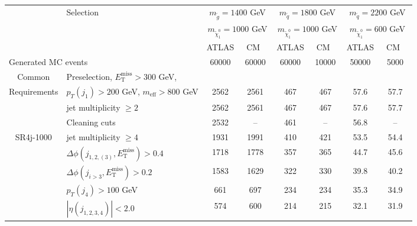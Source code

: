 \documentclass[10pt,fleqn]{article}
\newcommand{\met}{E^\mathrm{miss}_\mathrm{T}}
\newcommand{\meff}{m_\mathrm{eff}}
\begin{document}
\thispagestyle{empty}
\begin{table}[H]  \centering
 \renewcommand*{\arraystretch}{1.}
 \begin{tabular}{c|l|c|c|c|c|c|c} \toprule
      & Selection & \multicolumn{2}{c|}{$m_{\tilde{g}} = 1400$ GeV}      & \multicolumn{2}{c|}{$m_{\tilde{q}} = 1800$ GeV}         & \multicolumn{2}{c}{$m_{\tilde{q}} = 2200$ GeV}         \\ 
      &           & \multicolumn{2}{c|}{$m_{\tilde{\chi}^0_1} = 1000$ GeV}  & \multicolumn{2}{c|}{$m_{\tilde{\chi}^0_1} = 1000$ GeV}   & \multicolumn{2}{c}{$m_{\tilde{\chi}^0_1} = 600$ GeV}     \\ \midrule
      &           & ATLAS             &  ~CM~~                           & ATLAS             & ~CM~~                            & ATLAS             & ~CM~~                            \\ \midrule
\multicolumn{2}{l|}{Generated MC events}                       &   60000    &   60000   &  60000     &  10000    &     50000    &   5000         \\ \midrule   
Common& Preselection, $\met > 300$ GeV,&          &   &   &  & & \\ 
Requirements & $p_T(j_1) > 200$ GeV, $\meff > 800$ GeV         &     2562   &   2561    &  467       &   467     &      57.6    &   57.7         \\
             & jet multiplicity $\geq 2$                       &     2562   &   2561    &  467       &   467     &      57.6    &   57.7         \\
             & Cleaning cuts                                   &     2532   &   --      &  461       &   --      &      56.8    &   --          \\ \midrule
SR4j-1000    & jet multiplicity $\geq 4$                       &     1931   &   1991    &  410       &   421     &      53.5    &   54.4         \\
             & $\Delta\phi(j_{1,2,(3)},\met) > 0.4$            &     1718   &   1778    &  357       &   365     &      44.7    &   45.6         \\
             & $\Delta\phi(j_{i>3},\met) > 0.2$                &     1583   &   1629    &  322       &   330     &      39.8    &   40.2         \\
             & $p_T(j_4) > 100$ GeV                            &      661   &    697    &  234       &   234     &      35.3    &   34.9         \\      
             & $|\eta(j_{1,2,3,4})|< 2.0$                      &      574   &    600    &  214       &   215     &      32.1    &   31.9         \\           

\end{tabular}
\end{table}
\end{document}
